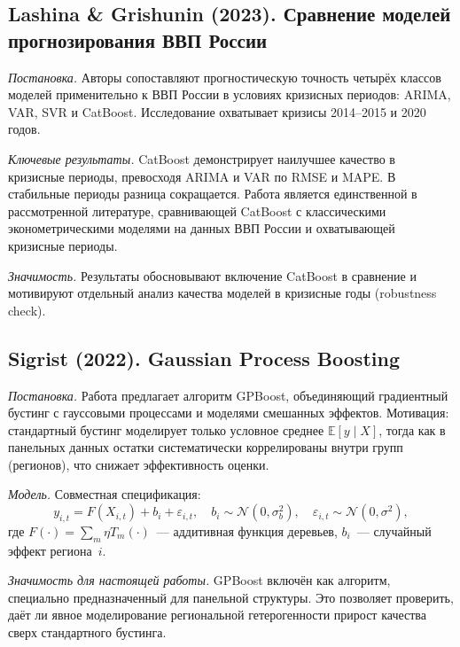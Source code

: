 \documentclass[12pt,a4paper]{article}
\begin{document}
\subsection{Lashina \& Grishunin (2023). Сравнение моделей
прогнозирования ВВП России~\cite{lashina2023}}

\textit{Постановка.} Авторы сопоставляют прогностическую точность четырёх
классов моделей применительно к ВВП России в условиях кризисных периодов:
ARIMA, VAR, SVR и CatBoost. Исследование охватывает кризисы 2014--2015
и 2020 годов.

\textit{Ключевые результаты.} CatBoost демонстрирует наилучшее качество
в кризисные периоды, превосходя ARIMA и VAR по RMSE и MAPE. В стабильные
периоды разница сокращается. Работа является единственной в рассмотренной
литературе, сравнивающей CatBoost с классическими эконометрическими
моделями на данных ВВП России и охватывающей кризисные периоды.

\textit{Значимость.} Результаты обосновывают включение CatBoost в сравнение
и мотивируют отдельный анализ качества моделей в кризисные годы (robustness
check).

\subsection{Sigrist (2022). Gaussian Process Boosting~\cite{sigrist2022}}

\textit{Постановка.} Работа предлагает алгоритм GPBoost, объединяющий
градиентный бустинг с гауссовыми процессами и моделями смешанных эффектов.
Мотивация: стандартный бустинг моделирует только условное среднее
$\mathbb{E}[y \mid X]$, тогда как в панельных данных остатки систематически
коррелированы внутри групп (регионов), что снижает эффективность оценки.

\textit{Модель.} Совместная спецификация:
\begin{equation}
  y_{i,t} = F(X_{i,t}) + b_i + \varepsilon_{i,t},
  \quad b_i \sim \mathcal{N}(0,\sigma_b^2),
  \quad \varepsilon_{i,t} \sim \mathcal{N}(0,\sigma^2),
\end{equation}
где $F(\cdot) = \sum_m \eta T_m(\cdot)$~--- аддитивная функция деревьев,
$b_i$~--- случайный эффект региона~$i$.

\textit{Значимость для настоящей работы.} GPBoost включён как алгоритм,
специально предназначенный для панельной структуры. Это позволяет проверить,
даёт ли явное моделирование региональной гетерогенности прирост качества
сверх стандартного бустинга.
\end{document}
